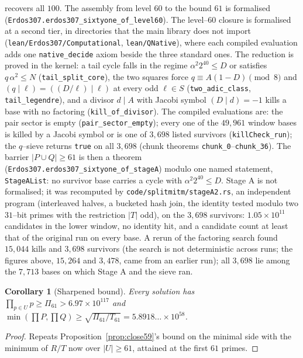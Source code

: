 \documentclass[11pt]{article}
\newtheorem{corollary}[theorem]{Corollary}
\theoremstyle{definition}
\begin{document}
recovers all $100$. The assembly from level $60$ to the bound $61$ is formalised
(\texttt{Erdos307.erdos307\_sixtyone\_of\_level60}).
The level--$60$ closure is formalised at a second tier, in directories that the main library does not import
(\texttt{lean/Erdos307/Computational}, \texttt{lean/QNative}), where each compiled evaluation adds one
\texttt{native\_decide} axiom beside the three standard ones. The reduction is proved in the kernel: a tail cycle falls in the
regime $\alpha^2 2^{40}\le D$ or satisfies $q\,\alpha^2\le N$ (\texttt{tail\_split\_core}), the two squares force
$q\equiv A(1-D)\pmod 8$ and $(q\mid\ell)=((D/\ell)\mid\ell)$ at every odd $\ell\in S$ (\texttt{two\_adic\_class},
\texttt{tail\_legendre}), and a divisor $d\mid A$ with Jacobi symbol $(D\mid d)=-1$ kills a base with no factoring
(\texttt{kill\_of\_divisor}). The compiled evaluations are: the pair sector is empty (\texttt{pair\_sector\_empty}); every one of
the $49{,}961$ window bases is killed by a Jacobi symbol or is one of $3{,}698$ listed survivors (\texttt{killCheck\_run});
the $q$--sieve returns \texttt{true} on all $3{,}698$ (chunk theorems \texttt{chunk\_0}--\texttt{chunk\_36}). The barrier
$|P\cup Q|\ge61$ is then a theorem (\texttt{Erdos307.erdos307\_sixtyone\_of\_stageA}) modulo one named statement,
\texttt{StageAList}: no survivor base carries a cycle with $\alpha^2 2^{40}\le D$. Stage A is not formalised; it was recomputed
by \texttt{code/splitmitm/stageA2.rs}, an independent program (interleaved halves, a bucketed hash join, the identity tested
modulo two $31$--bit primes with the restriction $|T|$ odd), on the $3{,}698$ survivors: $1.05\times10^{11}$ candidates in the
lower window, no identity hit, and a candidate count at least that of the original run on every base. A rerun of the
factoring search found $15{,}044$ kills and $3{,}698$ survivors (the search is not deterministic across runs; the figures
above, $15{,}264$ and $3{,}478$, came from an earlier run); all $3{,}698$ lie among the $7{,}713$ bases on which Stage A and
the sieve ran.


\begin{corollary}[Sharpened bound]\label{cor:level61bound}
Every solution has $\prod_{p\in U}p\ge\Pi_{61}>6.97\times10^{117}$ and
$\min(\prod P,\prod Q)\ge\sqrt{\Pi_{61}/T_{61}}=5.8918\ldots\times10^{58}$.
\end{corollary}
\begin{proof}
Repeats Proposition~\ref{prop:close59}'s bound on the minimal side with the minimum of $R/T$ now over $|U|\ge61$,
attained at the first $61$ primes.
\end{proof}
\end{document}
